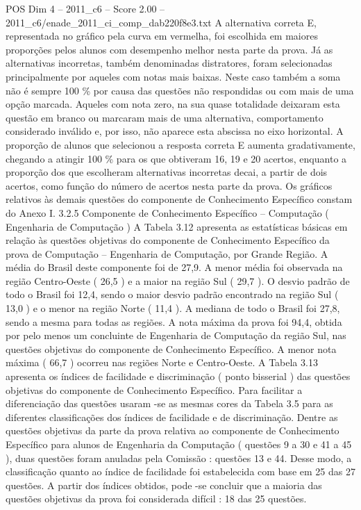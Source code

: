\begin{textsample}{POS Dim 4 – 2011\_c6 – Score 2.00 – 2011\_c6/enade\_2011\_ci\_comp\_dab220f8e3.txt}
A alternativa correta E, representada no gráfico pela curva em vermelha, foi escolhida em maiores proporções pelos alunos com desempenho melhor nesta parte da prova.
Já as alternativas incorretas, também denominadas distratores, foram selecionadas principalmente por aqueles com notas mais baixas.
Neste caso também a soma não é sempre 100 \% por causa das questões não respondidas ou com mais de uma opção marcada.
Aqueles com nota zero, na sua quase totalidade deixaram esta questão em branco ou marcaram mais de uma alternativa, comportamento considerado inválido e, por isso, não aparece esta abscissa no eixo horizontal.
A proporção de alunos que selecionou a resposta correta E aumenta gradativamente, chegando a atingir 100 \% para os que obtiveram 16, 19 e 20 acertos, enquanto a proporção dos que escolheram alternativas incorretas decai, a partir de dois acertos, como função do número de acertos nesta parte da prova.
Os gráficos relativos às demais questões do componente de Conhecimento Específico constam do Anexo I. 3.2.5 Componente de Conhecimento Específico – Computação ( Engenharia de Computação ) A Tabela 3.12 apresenta as estatísticas básicas em relação às questões objetivas do componente de Conhecimento Específico da prova de Computação – Engenharia de Computação, por Grande Região.
A média do Brasil deste componente foi de 27,9.
A menor média foi observada na região Centro-Oeste ( 26,5 ) e a maior na região Sul ( 29,7 ).
O desvio padrão de todo o Brasil foi 12,4, sendo o maior desvio padrão encontrado na região Sul ( 13,0 ) e o menor na região Norte ( 11,4 ).
A mediana de todo o Brasil foi 27,8, sendo a mesma para todas as regiões.
A nota máxima da prova foi 94,4, obtida por pelo menos um concluinte de Engenharia de Computação da região Sul, nas questões objetivas do componente de Conhecimento Específico.
A menor nota máxima ( 66,7 ) ocorreu nas regiões Norte e Centro-Oeste.
A Tabela 3.13 apresenta os índices de facilidade e discriminação ( ponto bisserial ) das questões objetivas do componente de Conhecimento Específico.
Para facilitar a diferenciação das questões usaram -se as mesmas cores da Tabela 3.5 para as diferentes classificações dos índices de facilidade e de discriminação.
Dentre as questões objetivas da parte da prova relativa ao componente de Conhecimento Específico para alunos de Engenharia da Computação ( questões 9 a 30 e 41 a 45 ), duas questões foram anuladas pela Comissão : questões 13 e 44.
Desse modo, a classificação quanto ao índice de facilidade foi estabelecida com base em 25 das 27 questões.
A partir dos índices obtidos, pode -se concluir que a maioria das questões objetivas da prova foi considerada difícil : 18 das 25 questões.

\end{textsample}
